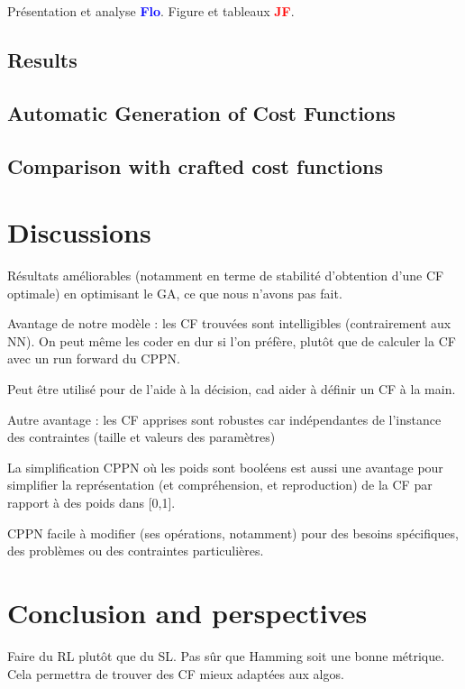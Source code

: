 \documentclass{article}
\newcommand{\flo}{\textcolor{blue}{\bf Flo}\xspace}
\newcommand{\jf}{\textcolor{red}{\bf JF}\xspace}
\begin{document}
Présentation et analyse \flo.
Figure et tableaux \jf.

\subsection{Results}

\subsection{Automatic Generation of Cost Functions}
\label{subsec:xpgeneration}

\subsection{Comparison with crafted cost functions}\label{subsec:xpcomparison}

\section{Discussions}

Résultats améliorables  (notamment en  terme de  stabilité d'obtention
d'une CF optimale) en optimisant le GA, ce que nous n'avons pas fait.

Avantage  de  notre  modèle  :  les  CF  trouvées  sont  intelligibles
(contrairement aux NN). On peut même les coder en dur si l'on préfère,
plutôt que de calculer la CF avec un run forward du CPPN.

Peut être utilisé pour de l'aide à la décision, cad aider à définir un
CF à la main.

Autre avantage  : les CF  apprises sont robustes car  indépendantes de
l'instance des contraintes (taille et valeurs des paramètres)

La  simplification CPPN  où  les  poids sont  booléens  est aussi  une
avantage  pour  simplifier  la représentation  (et  compréhension,  et
reproduction) de la CF par rapport à des poids dans [0,1].

CPPN facile  à modifier (ses  opérations, notamment) pour  des besoins
spécifiques, des problèmes ou des contraintes particulières.


\section{Conclusion and perspectives}\label{sec:conclusion}

Faire du  RL plutôt  que du  SL. Pas  sûr que  Hamming soit  une bonne
métrique. Cela permettra de trouver des CF mieux adaptées aux algos.




\end{document}
